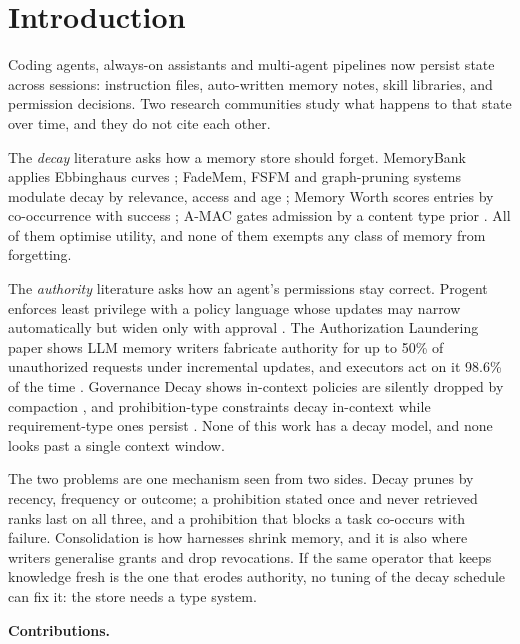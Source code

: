 \section{Introduction}
\label{sec:introduction}

Coding agents, always-on assistants and multi-agent pipelines now persist state across sessions: instruction files, auto-written memory notes, skill libraries, and permission decisions. Two research communities study what happens to that state over time, and they do not cite each other.

The \emph{decay} literature asks how a memory store should forget. MemoryBank applies Ebbinghaus curves \citep{zhong2023}; FadeMem, FSFM and graph-pruning systems modulate decay by relevance, access and age \citep{wei2026,gu2026,rusu2026}; Memory Worth scores entries by co-occurrence with success \citep{simsek2026}; A-MAC gates admission by a content type prior \citep{zhang2026c}. All of them optimise utility, and none of them exempts any class of memory from forgetting.

The \emph{authority} literature asks how an agent's permissions stay correct. Progent enforces least privilege with a policy language whose updates may narrow automatically but widen only with approval \citep{shi2025}. The Authorization Laundering paper shows LLM memory writers fabricate authority for up to 50\% of unauthorized requests under incremental updates, and executors act on it 98.6\% of the time \citep{cerruti2026}. Governance Decay shows in-context policies are silently dropped by compaction \citep{chen2026}, and prohibition-type constraints decay in-context while requirement-type ones persist \citep{gamage2026}. None of this work has a decay model, and none looks past a single context window.

The two problems are one mechanism seen from two sides. Decay prunes by recency, frequency or outcome; a prohibition stated once and never retrieved ranks last on all three, and a prohibition that blocks a task co-occurs with failure. Consolidation is how harnesses shrink memory, and it is also where writers generalise grants and drop revocations. If the same operator that keeps knowledge fresh is the one that erodes authority, no tuning of the decay schedule can fix it: the store needs a type system.

\textbf{Contributions.}

